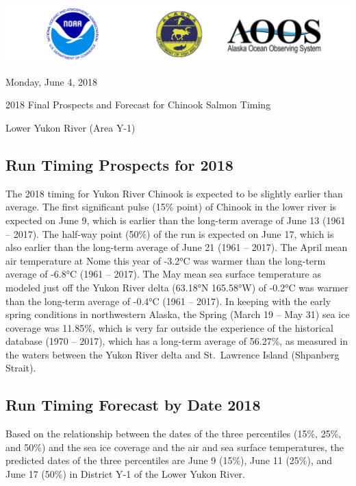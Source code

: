 \documentclass[]{article}
\title{}
\author{}
\date{}
\begin{document}
\includegraphics{images/combined.png}

Monday, June 4, 2018

\begin{center}
  \huge{2018 Final Prospects and Forecast for Chinook Salmon Timing}
  
  \large{Lower Yukon River (Area Y-1)}
\end{center}

\hypertarget{run-timing-prospects-for-2018}{%
\subsection{Run Timing Prospects for
2018}\label{run-timing-prospects-for-2018}}

The 2018 timing for Yukon River Chinook is expected to be slightly
earlier than average. The first significant pulse (15\% point) of
Chinook in the lower river is expected on June 9, which is earlier than
the long-term average of June 13 (1961 -- 2017). The half-way point
(50\%) of the run is expected on June 17, which is also earlier than the
long-term average of June 21 (1961 -- 2017). The April mean air
temperature at Nome this year of -3.2°C was warmer than the long-term
average of -6.8°C (1961 -- 2017). The May mean sea surface temperature
as modeled just off the Yukon River delta (63.18°N 165.58°W) of -0.2°C
was warmer than the long-term average of -0.4°C (1961 -- 2017). In
keeping with the early spring conditions in northwestern Alaska, the
Spring (March 19 -- May 31) sea ice coverage was 11.85\%, which is very
far outside the experience of the historical database (1970 -- 2017),
which has a long-term average of 56.27\%, as measured in the waters
between the Yukon River delta and St.~Lawrence Island (Shpanberg
Strait).

\hypertarget{run-timing-forecast-by-date-2018}{%
\subsection{Run Timing Forecast by Date
2018}\label{run-timing-forecast-by-date-2018}}

Based on the relationship between the dates of the three percentiles
(15\%, 25\%, and 50\%) and the sea ice coverage and the air and sea
surface temperatures, the predicted dates of the three percentiles are
June 9 (15\%), June 11 (25\%), and June 17 (50\%) in District Y-1 of the
Lower Yukon River.
\end{document}
